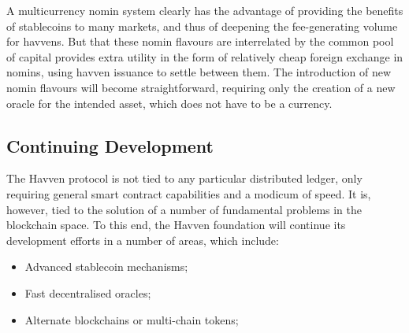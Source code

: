 \noindent A multicurrency nomin system clearly has the advantage of providing the
benefits of stablecoins to many markets, and thus of deepening
the fee-generating volume for havvens. But that these nomin flavours
are interrelated by the common pool of capital provides extra utility
in the form of relatively cheap foreign exchange in nomins, using 
havven issuance to settle between them.
The introduction of new nomin flavours will become straightforward,
requiring only the creation of a new oracle for the intended asset,
which does not have to be a currency. \\


\subsection{Continuing Development}

\noindent The Havven protocol is not tied to any particular distributed ledger,
only requiring general smart contract capabilities and a modicum of speed.
It is, however, tied to the solution of a number of fundamental problems
in the blockchain space. To this end, the Havven foundation will continue
its development efforts in a number of areas, which include:

\begin{itemize}
    \item Advanced stablecoin mechanisms;
    \item Fast decentralised oracles;
    \item Alternate blockchains or multi-chain tokens;
\end{itemize}


